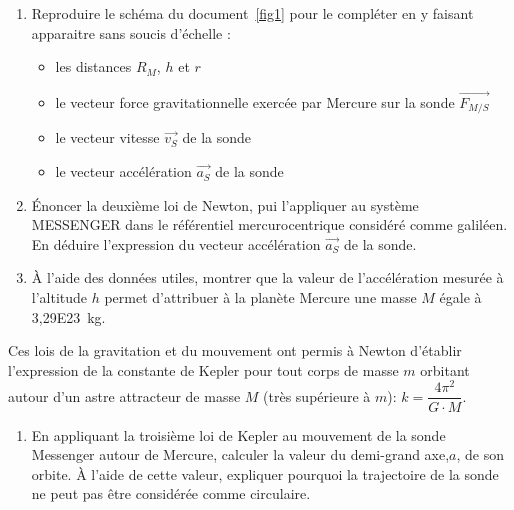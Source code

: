\documentclass[a4paper,11pt,fleqn]{article}%
\begin{document}
\begin{enumerate}[resume]
    \item Reproduire le schéma du document~\ref{fig1} pour le compléter en y faisant apparaitre sans soucis d'échelle : \begin{itemize}
        \item les distances $R_M$, $h$ et $r$
        \item le vecteur force gravitationnelle exercée par Mercure sur la sonde $\vec{F_{M/S}}$
        \item le vecteur vitesse $\vec{v_S}$ de la sonde
        \item le vecteur accélération $\vec{a_S}$ de la sonde
    \end{itemize}
    \item Énoncer la deuxième loi de Newton, pui l'appliquer au système MESSENGER dans le référentiel mercurocentrique considéré comme galiléen. En déduire l'expression du vecteur accélération $\vec{a_S}$ de la sonde.
    \item À l'aide des données utiles, montrer que la valeur de l'accélération mesurée à l'altitude $h$ permet d'attribuer à la planète Mercure une masse $M$ égale à \SI{3,29E23}{kg}.
\end{enumerate}
Ces lois de la gravitation et du mouvement ont permis à Newton d'établir l'expression de la constante de Kepler pour tout corps de masse $m$ orbitant autour d'un astre attracteur de masse $M$ (très supérieure à $m$): $k = \dfrac{4\pi ^2}{G\cdot M}$.
\begin{enumerate}[resume]
    \item En appliquant la troisième loi de Kepler au mouvement de la sonde Messenger autour de Mercure, calculer la valeur du demi-grand axe,$a$, de son orbite. À l'aide de cette valeur, expliquer pourquoi la trajectoire de la sonde ne peut pas être considérée comme circulaire.
\end{enumerate}
\end{document}

